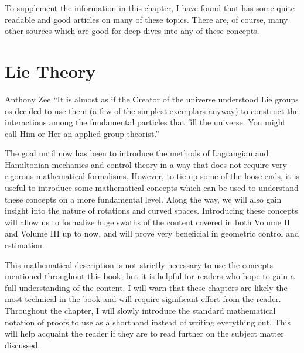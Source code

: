 To supplement the information in this chapter, I have found that \cite{hirvonen_profound_nodate} has some quite readable and good articles on many of these topics. There are, of course, many other sources which are good for deep dives into any of these concepts.


\chapter{Lie Theory}\label{chap:lie theory}


\begin{chapquote}{Anthony Zee}
    ``It is almost as if the Creator of the universe understood Lie groups os decided to use them (a few of the simplest exemplars anyway) to construct the interactions among the fundamental particles that fill the universe. You
might call Him or Her an applied group theorist.''
\end{chapquote}


The goal until now has been to introduce the methods of \gls{Lagrangian} and \gls{Hamiltonian} mechanics and control theory in a way that does not require very rigorous mathematical formalisms. However, to tie up some of the loose ends, it is useful to introduce some mathematical concepts which can be used to understand these concepts on a more fundamental level. Along the way, we will also gain insight into the nature of rotations and curved spaces. Introducing these concepts will allow us to formalize huge swaths of the content covered in both Volume II and Volume III up to now, and will prove very beneficial in geometric control and estimation.

This mathematical description is not strictly necessary to use the concepts mentioned throughout this book, but it is helpful for readers who hope to gain a full understanding of the content. I will warn that these chapters are likely the most technical in the book and will require significant effort from the reader. Throughout the chapter, I will slowly introduce the standard mathematical notation of proofs to use as a shorthand instead of writing everything out. This will help acquaint the reader if they are to read further on the subject matter discussed.

